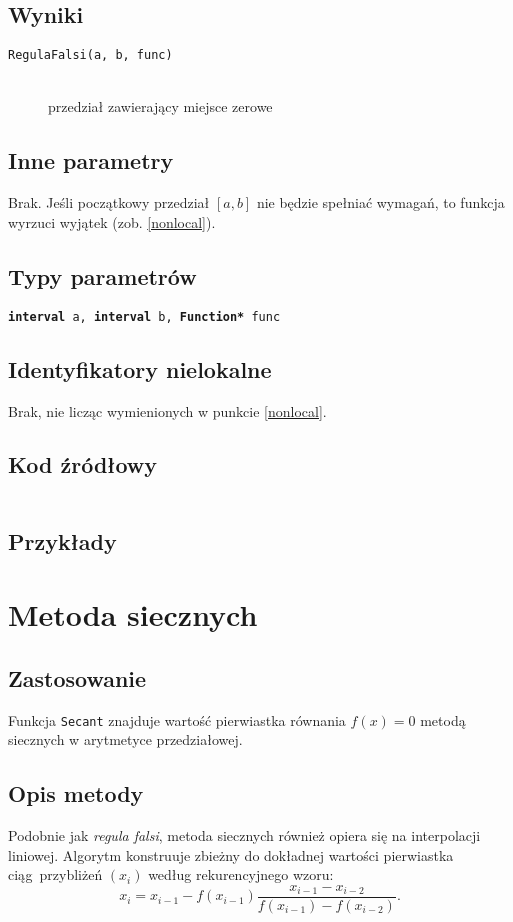 \documentclass[12pt]{article}
\begin{document}
		\subsection{Wyniki}
			\begin{description}
				\item[\texttt{RegulaFalsi(a, b, func)}] \hfill\\
					przedział zawierający miejsce zerowe
			\end{description}

		\subsection{Inne parametry}
			Brak. Jeśli początkowy przedział $[a, b]$ nie będzie spełniać wymagań, to funkcja wyrzuci wyjątek (zob. \ref{nonlocal}).

		\subsection{Typy parametrów}
			\texttt{\textbf{interval} a, \textbf{interval} b, \textbf{Function*} func}

		\subsection{Identyfikatory nielokalne}
      Brak, nie licząc wymienionych w punkcie \ref{nonlocal}.

		\subsection{Kod źródłowy}
			\inputminted[firstline=3, lastline=37]{c++}{../solvers/regulafalsi.cpp}


		\subsection{Przykłady}

	\section{Metoda siecznych}
		\subsection{Zastosowanie}
    Funkcja \texttt{Secant} znajduje wartość pierwiastka równania
    $f(x) = 0$ metodą siecznych w arytmetyce przedziałowej.

		\subsection{Opis metody}
			Podobnie jak \textsl{regula falsi}, metoda siecznych również opiera się na interpolacji liniowej.
			Algorytm konstruuje zbieżny do dokładnej wartości pierwiastka ciąg~przybliżeń $(x_i)$ według rekurencyjnego wzoru:
			\begin{equation*}
				x_i = x_{i-1} - f(x_{i-1}) \frac{x_{i-1} - x_{i-2}}{f(x_{i-1}) - f(x_{i-2})}.
			\end{equation*}
\end{document}
